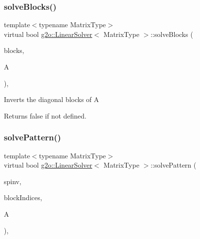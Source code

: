 \subsubsection{\texorpdfstring{solve\+Blocks()}{solveBlocks()}}
{\footnotesize\ttfamily template$<$typename Matrix\+Type$>$ \\
virtual bool \mbox{\hyperlink{classg2o_1_1_linear_solver}{g2o\+::\+Linear\+Solver}}$<$ Matrix\+Type $>$\+::solve\+Blocks (\begin{DoxyParamCaption}\item[{double $\ast$$\ast$\&}]{blocks,  }\item[{const \mbox{\hyperlink{classg2o_1_1_sparse_block_matrix}{Sparse\+Block\+Matrix}}$<$ Matrix\+Type $>$ \&}]{A }\end{DoxyParamCaption})\hspace{0.3cm}{\ttfamily [inline]}, {\ttfamily [virtual]}}

Inverts the diagonal blocks of A \begin{DoxyReturn}{Returns}
false if not defined. 
\end{DoxyReturn}
\mbox{\label{classg2o_1_1_linear_solver_adc74484f72bbe373622581fd597c1be3}} 
\subsubsection{\texorpdfstring{solve\+Pattern()}{solvePattern()}}
{\footnotesize\ttfamily template$<$typename Matrix\+Type$>$ \\
virtual bool \mbox{\hyperlink{classg2o_1_1_linear_solver}{g2o\+::\+Linear\+Solver}}$<$ Matrix\+Type $>$\+::solve\+Pattern (\begin{DoxyParamCaption}\item[{\mbox{\hyperlink{classg2o_1_1_sparse_block_matrix}{Sparse\+Block\+Matrix}}$<$ Matrix\+Xd $>$ \&}]{spinv,  }\item[{const std\+::vector$<$ std\+::pair$<$ int, int $>$ $>$ \&}]{block\+Indices,  }\item[{const \mbox{\hyperlink{classg2o_1_1_sparse_block_matrix}{Sparse\+Block\+Matrix}}$<$ Matrix\+Type $>$ \&}]{A }\end{DoxyParamCaption})\hspace{0.3cm}{\ttfamily [inline]}, {\ttfamily [virtual]}}

